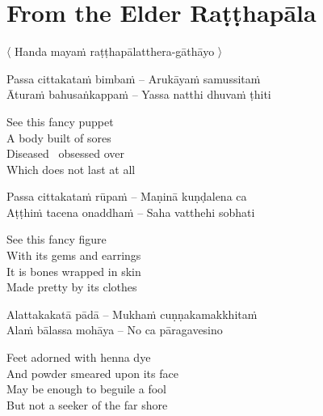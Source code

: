 
\section{From the Elder Raṭṭhapāla}
\label{ratthapala}

\begin{leader}
  〈 Handa mayaṁ raṭṭhapālatthera-gāthāyo 〉

\end{leader}

\begin{twochants}
  Passa cittakataṁ bimbaṁ – Arukāyaṁ samussitaṁ\\
  Āturaṁ bahusaṅkappaṁ – Yassa natthi dhuvaṁ ṭhiti\\
\end{twochants}

\begin{english-verses}
  See this fancy puppet\\
  A body built of sores\\
  Diseased \breathmark\ obsessed over\\
  Which does not last at all
\end{english-verses}

\begin{twochants}
  Passa cittakataṁ rūpaṁ – Maṇinā kuṇḍalena ca\\
  Aṭṭhiṁ tacena onaddhaṁ – Saha vatthehi sobhati\\
\end{twochants}

\begin{english-verses}
  See this fancy figure\\
  With its gems and earrings\\
  It is bones wrapped in skin\\
  Made pretty by its clothes
\end{english-verses}

\begin{twochants}
  Alattakakatā pādā – Mukhaṁ cuṇṇakamakkhitaṁ\\
  Alaṁ bālassa mohāya – No ca pāragavesino\\
\end{twochants}

\begin{english-verses}
  Feet adorned with henna dye\\
  And powder smeared upon its face\\
  May be enough to beguile a fool\\
  But not a seeker of the far shore
\end{english-verses}

